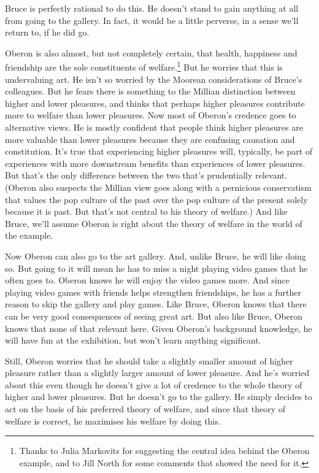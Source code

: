 \gls{Bruce} is perfectly rational to do this. He doesn't stand to gain anything at all from going to the gallery. In fact, it would be a little perverse, in a sense we'll return to, if he did go.

\gls{Oberon} is also almost, but not completely certain, that health, happiness and friendship are the sole constituents of welfare.\footnote{Thanks to Julia Markovits for suggesting the central idea behind the Oberon example, and to Jill North for some comments that showed the need for it.} But he worries that this is undervaluing art. He isn't so worried by the Moorean considerations of \gls{Bruce}'s colleagues. But he fears there is something to the Millian distinction between higher and lower pleasures, and thinks that perhaps higher pleasures contribute more to welfare than lower pleasures. Now most of \gls{Oberon}'s credence goes to alternative views. He is mostly confident that people think higher pleasures are more valuable than lower pleasures because they are confusing causation and constitution. It's true that experiencing higher pleasures will, typically, be part of experiences with more downstream benefits than experiences of lower pleasures. But that's the only difference between the two that's prudentially relevant. (Oberon also suspects the Millian view goes along with a pernicious conservatism that values the pop culture of the past over the pop culture of the present solely because it is past. But that's not central to his theory of welfare.) And like \gls{Bruce}, we'll assume \gls{Oberon} is right about the theory of welfare in the world of the example.

Now \gls{Oberon} can also go to the art gallery. And, unlike \gls{Bruce}, he will like doing so. But going to it will mean he has to miss a night playing video games that he often goes to. \gls{Oberon} knows he will enjoy the video games more. And since playing video games with friends helps strengthen friendships, he has a further reason to skip the gallery and play games. Like \gls{Bruce}, \gls{Oberon} knows that there can be very good consequences of seeing great art. But also like \gls{Bruce}, \gls{Oberon} knows that none of that relevant here. Given \gls{Oberon}'s background knowledge, he will have fun at the exhibition, but won't learn anything significant.

Still, \gls{Oberon} worries that he should take a slightly smaller amount of higher pleasure rather than a slightly larger amount of lower pleasure. And he's worried about this even though he doesn't give a lot of credence to the whole theory of higher and lower pleasures. But he doesn't go to the gallery. He simply decides to act on the basis of his preferred theory of welfare, and since that theory of welfare is correct, he maximises his welfare by doing this.

